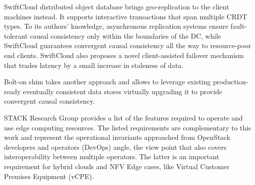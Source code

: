 \documentclass[conference]{IEEEtran}
\begin{document}
SwiftCloud distributed object database\cite{b12} brings geo-replication to the
client machines instead. It supports interactive transactions that span
multiple CRDT types. To its authors' knowledge, asynchronous replication
systems ensure fault-tolerant causal consistency only within the boundaries of
the DC, while SwiftCloud guarantees convergent causal consistency all the way
to resource-poor end clients. SwiftCloud also proposes a novel client-assisted
failover mechanism that trades latency by a small increase in staleness of
data.

Bolt-on\cite{b13} shim takes another approach and allows to leverage existing
production-ready eventually consistent data stores virtually upgrading it to
provide convergent causal consistency.

STACK Research Group\cite{b8} provides a list of the features required to
operate and use edge computing resources. The listed requirements are
complementary to this work and represent the operational invariants approached
from OpenStack developers and operators (DevOps) angle, the view point that
also covers interoperability between multiple operators. The latter is an
important requirement for hybrid clouds and NFV Edge cases, like Virtual
Customer Premises Equipment (vCPE).
\end{document}
